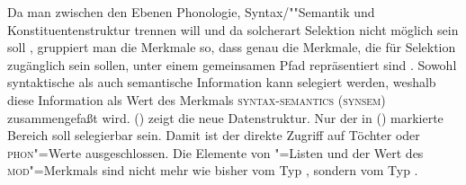 Da man zwischen den Ebenen Phonologie, Syntax/""Semantik und Konstituentenstruktur trennen will
und da solcherart Selektion nicht möglich sein soll \citep[--144]{ps}, gruppiert man die Merkmale so,
dass genau die Merkmale, die für Selektion zugänglich sein sollen,
unter einem gemeinsamen Pfad repräsentiert sind \citep[]{ps2}.
Sowohl syntaktische als auch semantische Information kann selegiert werden, weshalb diese
Information als Wert des Merkmals \textsc{syntax-semantics} (\textsc{synsem}) zusammengefaßt wird. ()
zeigt die neue Datenstruktur.
Nur der in () markierte Bereich soll selegierbar sein. Damit ist der direkte
Zugriff auf Töchter oder \textsc{phon}"=Werte ausgeschlossen. Die Elemente von \comps{}"=Listen
und der Wert des \textsc{mod}"=Merkmals sind nicht mehr wie bisher vom Typ , sondern vom Typ
.
\ea
{}
\z
%

